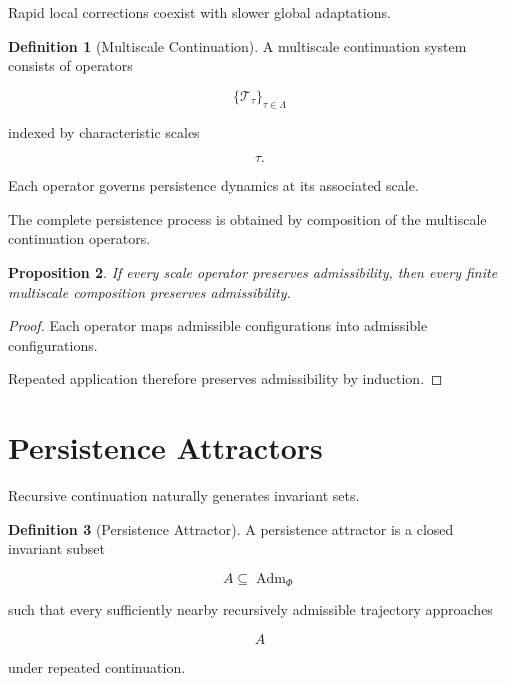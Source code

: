 \documentclass[11pt]{book}
\numberwithin{equation}{chapter}
\theoremstyle{definition}
\newtheorem{definition}{Definition}[chapter]
\theoremstyle{plain}
\newtheorem{proposition}[definition]{Proposition}
\begin{document}
Rapid local corrections coexist with slower global adaptations.

\begin{definition}[Multiscale Continuation]

A multiscale continuation system consists of operators

\[
\{
\mathcal T_{\tau}
\}_{\tau\in\Lambda}
\]

indexed by characteristic scales

\[
\tau.
\]

Each operator governs persistence dynamics at its associated scale.

\end{definition}

The complete persistence process is obtained by composition of the
multiscale continuation operators.

\begin{proposition}

If every scale operator preserves admissibility, then every finite
multiscale composition preserves admissibility.

\end{proposition}

\begin{proof}

Each operator maps admissible configurations into admissible
configurations.

Repeated application therefore preserves admissibility by induction.

\end{proof}

\section{Persistence Attractors}

Recursive continuation naturally generates invariant sets.

\begin{definition}[Persistence Attractor]

A persistence attractor is a closed invariant subset

\[
A
\subseteq
\operatorname{Adm}_{\Phi}
\]

such that every sufficiently nearby recursively admissible trajectory
approaches

\[
A
\]

under repeated continuation.

\end{definition}
\end{document}
